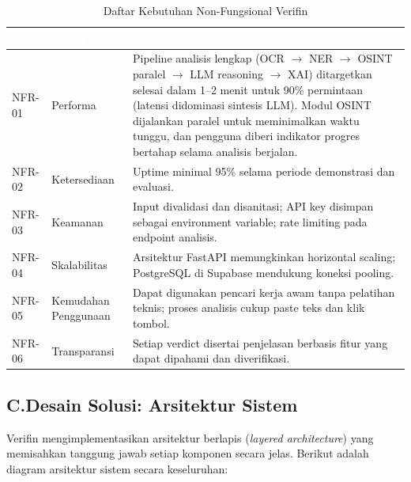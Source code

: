 \documentclass[12pt,a4paper]{article}
\newcommand{\thead}[1]{\textcolor{white}{\textbf{#1}}}
\begin{document}
\begin{adjustwidth}{0.50cm}{0pt}
\begin{table}[H]
\centering
\caption{Daftar Kebutuhan Non-Fungsional Verifin}
\label{tab:nfr-list}
\small
\begin{tabularx}{\linewidth}{@{}p{1.6cm}p{3.0cm}Y@{}}
\toprule
{}\thead{ID} & \thead{Nama} & \thead{Deskripsi} \\
\midrule
{}
NFR-01 & Performa & Pipeline analisis lengkap (OCR $\to$ NER $\to$ OSINT paralel $\to$ LLM reasoning $\to$ XAI) ditargetkan selesai dalam 1--2 menit untuk 90\% permintaan (latensi didominasi sintesis LLM). Modul OSINT dijalankan paralel untuk meminimalkan waktu tunggu, dan pengguna diberi indikator progres bertahap selama analisis berjalan. \\
NFR-02 & Ketersediaan & Uptime minimal 95\% selama periode demonstrasi dan evaluasi. \\
NFR-03 & Keamanan & Input divalidasi dan disanitasi; API key disimpan sebagai environment variable; rate limiting pada endpoint analisis. \\
NFR-04 & Skalabilitas & Arsitektur FastAPI memungkinkan horizontal scaling; PostgreSQL di Supabase mendukung koneksi pooling. \\
NFR-05 & Kemudahan Penggunaan & Dapat digunakan pencari kerja awam tanpa pelatihan teknis; proses analisis cukup paste teks dan klik tombol. \\
NFR-06 & Transparansi & Setiap verdict disertai penjelasan berbasis fitur yang dapat dipahami dan diverifikasi. \\
\bottomrule
\end{tabularx}
\end{table}
\end{adjustwidth}

\subsection*{C.\quad Desain Solusi: Arsitektur Sistem}

Verifin mengimplementasikan arsitektur berlapis (\textit{layered architecture}) yang memisahkan
tanggung jawab setiap komponen secara jelas. Berikut adalah diagram arsitektur sistem secara
keseluruhan:\par

\vspace{0.5cm}
\end{document}

